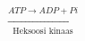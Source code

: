 \documentclass[preview]{standalone}
\begin{document}
\begin{align*}
\xrightarrow[\text{Heksoosi kinaas}]{ATP \rightarrow ADP + Pi}
\end{align*}
\end{document}
